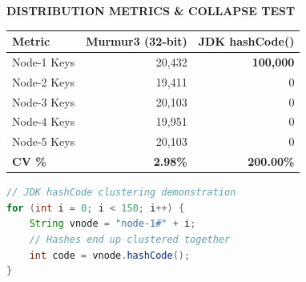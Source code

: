 \documentclass[12pt]{article}
\begin{document}
\begin{minipage}[t]{0.48\textwidth}
    \vspace{0pt}
    {\fontsize{9.5}{11}\selectfont\color{shidenmuted}\textbf{DISTRIBUTION METRICS \& COLLAPSE TEST}\par}
    \vspace{3.5mm}
    
    \fontsize{9.5}{12.5}\selectfont
    \noindent
    \begin{tabular}{lrr}
    \toprule
    \textbf{Metric} & \textbf{Murmur3 (32-bit)} & \textbf{JDK hashCode()} \\
    \midrule
    Node-1 Keys & 20,432 & \textbf{100,000} \\
    Node-2 Keys & 19,411 & 0 \\
    Node-3 Keys & 20,103 & 0 \\
    Node-4 Keys & 19,951 & 0 \\
    Node-5 Keys & 20,103 & 0 \\
    \midrule
    \textbf{CV \%} & \textbf{2.98\%} & \textbf{200.00\%} \\
    \bottomrule
    \end{tabular}
    
    \vspace{3mm}
    \begin{lstlisting}[language=Java]
// JDK hashCode clustering demonstration
for (int i = 0; i < 150; i++) {
    String vnode = "node-1#" + i;
    // Hashes end up clustered together
    int code = vnode.hashCode();
}
    \end{lstlisting}
\end{minipage}
\clearpage
\end{document}
